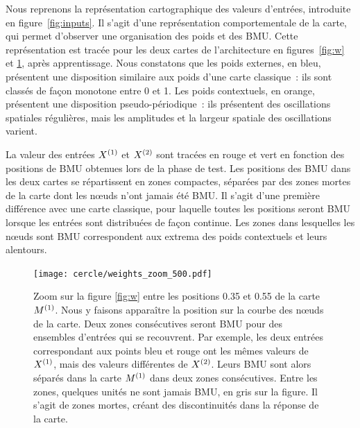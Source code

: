 \documentclass[../main]{subfiles}
\begin{document}
Nous reprenons la représentation cartographique des valeurs d'entrées, introduite en figure~\ref{fig:inputs}. Il s'agit d'une représentation comportementale de la carte, qui permet d'observer une organisation des poids et des BMU.
Cette représentation est tracée pour les deux cartes de l'architecture en figures~\ref{fig:w} et \ref{fig:w_zoom}, après apprentissage.
Nous constatons que les poids externes, en bleu, présentent une disposition similaire aux poids d'une carte classique~: ils sont classés de façon monotone entre 0 et 1. Les poids contextuels, en orange, présentent une disposition pseudo-périodique~: ils présentent des oscillations spatiales régulières, mais les amplitudes et la largeur spatiale des oscillations varient.

La valeur des entrées $X^{({1})}$ et $X^{({2})}$ sont tracées en rouge et vert en fonction des positions de BMU obtenues lors de la phase de test.
Les positions des BMU dans les deux cartes se répartissent en zones compactes, séparées par des zones mortes de la carte dont les n\oe{}uds n'ont jamais été BMU. 
Il s'agit d'une première différence avec une carte classique, pour laquelle toutes les positions seront BMU lorsque les entrées sont distribuées de façon continue. Les zones dans lesquelles les n\oe{}uds sont BMU correspondent aux extrema des poids contextuels et leurs alentours.


\begin{figure}
	\centering\texttt{[image: cercle/weights\_zoom\_500.pdf]}
   \caption{Zoom sur la figure \ref{fig:w} entre les positions 0.35 et 0.55 de la carte $M^{({1})}$. 
   Nous y faisons apparaître la position sur la courbe des n\oe{}uds de la carte.
   Deux zones consécutives seront BMU pour des ensembles d'entrées qui se recouvrent. Par exemple, les deux entrées correspondant aux points bleu et rouge ont les mêmes valeurs de $X^{({1})}$, mais des valeurs différentes de $X^{({2})}$. Leurs BMU sont alors séparés dans la carte $M^{({1})}$ dans deux zones consécutives.
   Entre les zones, quelques unités ne sont jamais BMU, en gris sur la figure. Il s'agit de zones mortes, créant des discontinuités dans la réponse de la carte.
   \label{fig:w_zoom}}
\end{figure}
\end{document}
